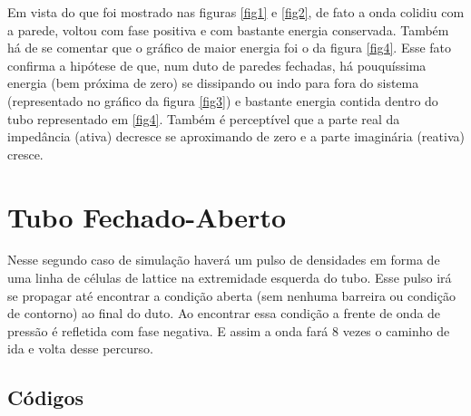 Em vista do que foi mostrado nas figuras \ref{fig1} e \ref{fig2}, de fato a onda colidiu com a parede, voltou com fase positiva e com bastante energia conservada. Também há de se comentar que o gráfico de maior energia foi o da figura \ref{fig4}. Esse fato confirma a hipótese de que, num duto de paredes fechadas, há pouquíssima energia (bem próxima de zero) se dissipando ou indo para fora do sistema (representado no gráfico da figura \ref{fig3}) e bastante energia contida dentro do tubo representado em \ref{fig4}. Também é perceptível que a parte real da impedância (ativa) decresce se aproximando de zero e a parte imaginária (reativa) cresce.
    
\newpage
\section{Tubo Fechado-Aberto}
Nesse segundo caso de simulação haverá um pulso de densidades em forma de uma linha de células de lattice na extremidade esquerda do tubo. Esse pulso irá se propagar até encontrar a condição aberta (sem nenhuma barreira ou condição de contorno) ao final do duto. Ao encontrar essa condição a frente de onda de pressão é refletida com fase negativa. E assim a onda fará 8 vezes o caminho de ida e volta desse percurso.

\subsection{Códigos}



